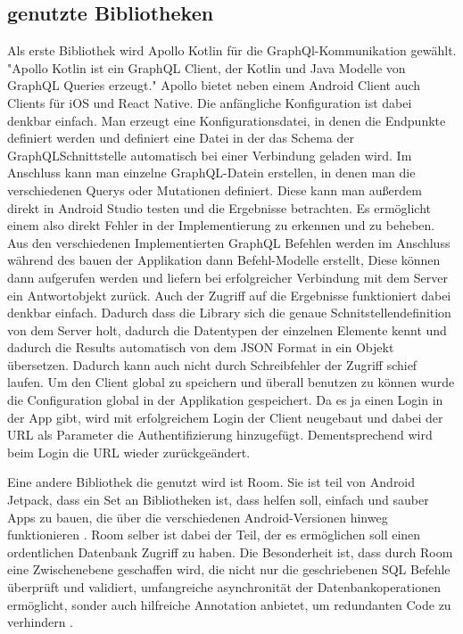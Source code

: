 \subsection{genutzte Bibliotheken}
Als erste Bibliothek wird Apollo Kotlin  für die GraphQl-Kommunikation gewählt. "Apollo Kotlin ist ein GraphQL Client, der Kotlin und Java Modelle von GraphQL Queries erzeugt."\cite{Apollo_kotlin_docs} Apollo bietet neben einem Android Client auch Clients für iOS und React Native. Die anfängliche Konfiguration ist dabei denkbar einfach. Man erzeugt eine Konfigurationsdatei, in denen die Endpunkte definiert werden und definiert eine Datei in der das Schema der GraphQLSchnittstelle automatisch bei einer Verbindung geladen wird. Im Anschluss kann man einzelne GraphQL-Datein erstellen, in denen man die verschiedenen Querys oder Mutationen definiert. Diese kann man außerdem direkt in Android Studio testen und die Ergebnisse betrachten. Es ermöglicht einem also direkt Fehler in der Implementierung zu erkennen und zu beheben. 
Aus den verschiedenen Implementierten GraphQL Befehlen werden im Anschluss während des bauen der Applikation dann Befehl-Modelle erstellt, Diese können dann aufgerufen werden und liefern bei erfolgreicher Verbindung mit dem Server ein Antwortobjekt zurück. Auch der Zugriff auf die Ergebnisse funktioniert dabei denkbar einfach. Dadurch dass die Library sich die genaue Schnitstellendefinition von dem Server holt, dadurch die Datentypen der einzelnen Elemente kennt und dadurch die Results automatisch von dem JSON Format in ein Objekt übersetzen. Dadurch kann auch nicht durch Schreibfehler der Zugriff schief laufen. Um den Client global zu speichern und überall benutzen zu können wurde die Configuration global in der Applikation gespeichert. Da es ja einen Login in der App gibt, wird mit erfolgreichem Login der Client neugebaut und dabei der URL als Parameter die Authentifizierung hinzugefügt. Dementsprechend wird beim Login die URL wieder zurückgeändert.

Eine andere Bibliothek die genutzt wird ist Room. Sie ist teil von Android Jetpack, dass ein Set an Bibliotheken ist, dass helfen soll, einfach und sauber Apps zu bauen, die über die verschiedenen Android-Versionen hinweg funktionieren \cite{Jetpack_android}. Room selber ist dabei der Teil, der es ermöglichen soll einen ordentlichen Datenbank Zugriff zu haben. Die Besonderheit ist, dass durch Room eine Zwischenebene geschaffen wird, die nicht nur die geschriebenen SQL Befehle überprüft und validiert, umfangreiche asynchronität der Datenbankoperationen ermöglicht, sonder auch hilfreiche Annotation anbietet, um redundanten Code zu verhindern \cite{Room_docs}.

